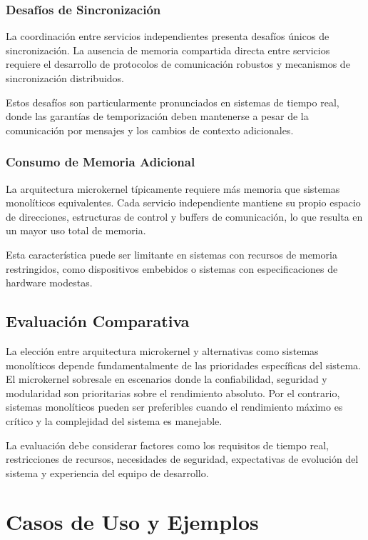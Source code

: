 \documentclass[12pt,a4paper]{article}
\begin{document}
\subsubsection{Desafíos de Sincronización}

La coordinación entre servicios independientes presenta desafíos únicos de sincronización. La ausencia de memoria compartida directa entre servicios requiere el desarrollo de protocolos de comunicación robustos y mecanismos de sincronización distribuidos.

Estos desafíos son particularmente pronunciados en sistemas de tiempo real, donde las garantías de temporización deben mantenerse a pesar de la comunicación por mensajes y los cambios de contexto adicionales.

\subsubsection{Consumo de Memoria Adicional}

La arquitectura microkernel típicamente requiere más memoria que sistemas monolíticos equivalentes. Cada servicio independiente mantiene su propio espacio de direcciones, estructuras de control y buffers de comunicación, lo que resulta en un mayor uso total de memoria.

Esta característica puede ser limitante en sistemas con recursos de memoria restringidos, como dispositivos embebidos o sistemas con especificaciones de hardware modestas.

\subsection{Evaluación Comparativa}

La elección entre arquitectura microkernel y alternativas como sistemas monolíticos depende fundamentalmente de las prioridades específicas del sistema. El microkernel sobresale en escenarios donde la confiabilidad, seguridad y modularidad son prioritarias sobre el rendimiento absoluto. Por el contrario, sistemas monolíticos pueden ser preferibles cuando el rendimiento máximo es crítico y la complejidad del sistema es manejable.

La evaluación debe considerar factores como los requisitos de tiempo real, restricciones de recursos, necesidades de seguridad, expectativas de evolución del sistema y experiencia del equipo de desarrollo.

\section{Casos de Uso y Ejemplos}
\end{document}

